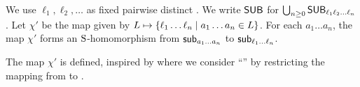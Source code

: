 We use $\ell_{1}, \ell_{2}, \dots$ as fixed pairwise distinct .
We write $\mathsf{SUB}$ for $\bigcup_{n \ge 0} \mathsf{SUB}_{\ell_{1} \ell_{2} \dots \ell_{n}}$.
Let $\chi'$ be the map given by $L \mapsto \{\ell_1 \dots \ell_{n} \mid a_1 \dots a_n \in L\}$.
For each  $a_1 \dots a_n$,
the map $\chi'$ forms an $\mathrm{S}$-homomorphism from $\mathsf{sub}_{a_1 \dots a_n}$ to $\mathsf{sub}_{\ell_1 \dots \ell_n}$.
\begin{remark}
    The map $\chi'$ is defined, inspired by  \cite{nakamuraWordstoLettersValuationsLanguage2023} where we consider ``\intro*{}'' by restricting the mapping from  to .
\end{remark}
